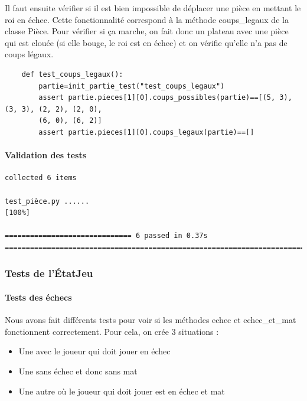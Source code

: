 \documentclass{article}
\begin{document}
Il faut ensuite vérifier si il est bien impossible de déplacer une pièce en mettant le roi en échec. 
Cette fonctionnalité correspond à la méthode coups\_legaux de la classe Pièce. 
Pour vérifier si ça marche, on fait donc un plateau avec une pièce qui est clouée (si elle bouge, le roi est en échec) et on vérifie qu'elle n'a pas de coups légaux.

\begin{verbatim}
    def test_coups_legaux():
        partie=init_partie_test("test_coups_legaux")
        assert partie.pieces[1][0].coups_possibles(partie)==[(5, 3), (3, 3), (2, 2), (2, 0), 
        (6, 0), (6, 2)]
        assert partie.pieces[1][0].coups_legaux(partie)==[]
\end{verbatim}

\paragraph{Validation des tests}
\begin{verbatim}
collected 6 items

test_pièce.py ......                                                                                                                                                  [100%]

============================== 6 passed in 0.37s ============================================================================= 
\end{verbatim}

\subsubsection{Tests de l'ÉtatJeu}
\paragraph{Tests des échecs}

Nous avons fait différents tests pour voir si les méthodes echec et echec\_et\_mat fonctionnent correctement. Pour cela, on crée 3 situations :
\begin{itemize}
    \item Une avec le joueur qui doit jouer en échec
    \item Une sans échec et donc sans mat
    \item Une autre où le joueur qui doit jouer est en échec et mat
\end{itemize}
\end{document}
